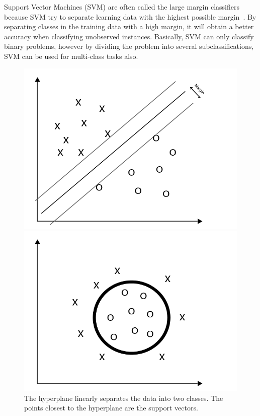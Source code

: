 Support Vector Machines (SVM) are often called the large margin classifiers because SVM try to separate learning data with the highest possible margin~\citep{article:fletcher}. By separating classes in the training data with a high margin, it will obtain a better accuracy when classifying unobserved instances. Basically, SVM can only classify binary problems, however by dividing the problem into several subclassifications, SVM can be used for multi-class tasks also.

\begin{figure}[ht]
	\begin{minipage}[b]{0.45\linewidth}
		\centering
		\includegraphics[width=\textwidth]{../img/linear.png}
		\caption[The hyperplane linearly separates the data into two classes.]{The hyperplane linearly separates the data into two classes. The points closest to the hyperplane are the support vectors.}
		\label{fig:linear}
	\end{minipage}
	\hspace{0.5cm}
	\begin{minipage}[b]{0.45\linewidth}
		\centering
		\includegraphics[width=\textwidth]{../img/non-linear.png}

\end{minipage}
\end{figure}
